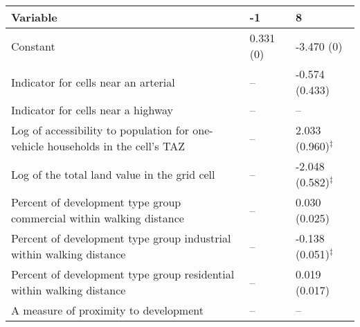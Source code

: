 
\begin{tabular}{p{3in}p{0.5in}p{0.5in}}
\hline\hline
Variable & -1 & 8 \\\hline
Constant & 0.331 (0) & -3.470 (0) \\
Indicator for cells near an arterial & -- & -0.574 (0.433) \\
Indicator for cells near a highway & -- & -- \\
Log of accessibility to population for one-vehicle households in the cell's TAZ & -- & 2.033 (0.960)$^{\ddagger}$ \\
Log of the total land value in the grid cell & -- & -2.048 (0.582)$^{\ddagger}$ \\
Percent of development type group commercial within walking distance & -- & 0.030 (0.025) \\
Percent of development type group industrial within walking distance & -- & -0.138 (0.051)$^{\ddagger}$ \\
Percent of development type group residential within walking distance & -- & 0.019 (0.017) \\
A measure of proximity to development & -- & -- \\
\hline\hline
\end{tabular}
